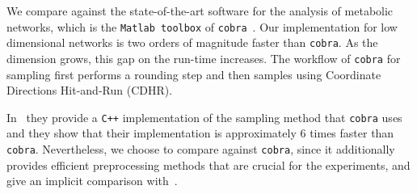    We compare against the state-of-the-art software for the analysis of
   metabolic networks, which is the \texttt{Matlab toolbox} of \texttt{cobra}~\citep{heirendt2019creation}. Our implementation for low dimensional
   networks is two orders of magnitude faster than \texttt{cobra}.
   As the dimension grows, this gap on the run-time increases.
   The workflow of \texttt{cobra} for sampling first performs a rounding step and then samples using Coordinate Directions Hit-and-Run (CDHR).

   In~\citep{jadebeck2020hops} they provide a \texttt{C++} implementation of the
   sampling method that \texttt{cobra} uses and they show that their implementation is
   approximately $6$ times faster than \texttt{cobra}. Nevertheless, we choose to
   compare against \texttt{cobra}, since it additionally provides efficient
   preprocessing methods that are crucial for the experiments, and give an implicit
   comparison with~\citep{jadebeck2020hops}.

